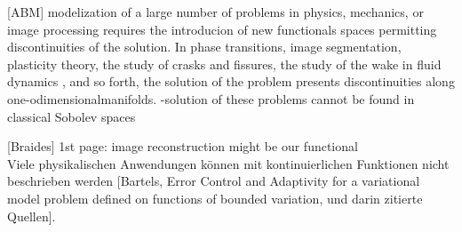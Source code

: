 [ABM] modelization of a large number of problems in physics, mechanics, or image
processing requires the introducion of new functionals spaces permitting
discontinuities of the solution. In phase transitions, image segmentation,
plasticity theory, the study of crasks and fissures, the study of the wake in
fluid dynamics , and so forth, the solution of the problem presents
discontinuities along one-odimensionalmanifolds.
-solution of these problems cannot be found in classical Sobolev spaces

[Braides] 1st page: image reconstruction might be our functional\\


Viele physikalischen Anwendungen können mit kontinuierlichen Funktionen nicht
beschrieben werden [Bartels, Error Control and Adaptivity for a variational
model problem defined on functions of bounded variation, und darin zitierte
Quellen].
